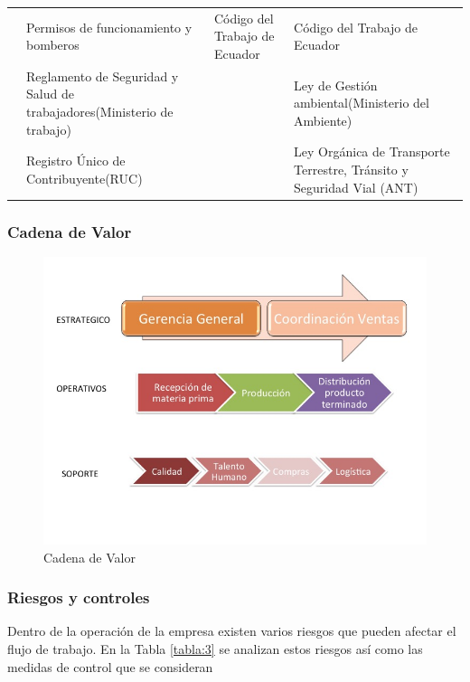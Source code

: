\documentclass[12pt, a4paper]{article}
\begin{document}
\begin{table}[H]
\begin{tabular}{|p{2cm}|p{3.5cm}|p{4cm}|p{4cm}|}
 & Permisos de funcionamiento y bomberos & Código del Trabajo de Ecuador & Código del Trabajo de Ecuador \\ \cline{2-4} 
 & Reglamento de Seguridad y Salud de trabajadores(Ministerio de trabajo) &  & Ley de Gestión ambiental(Ministerio del Ambiente) \\ \cline{2-4} 
 & Registro Único de Contribuyente(RUC) &  & Ley Orgánica de Transporte Terrestre, Tránsito y Seguridad Vial (ANT) \\ \hline
\end{tabular}
\end{table}


\subsubsection{Cadena de Valor}
\begin{figure}[H]
  \centering
  
    \includegraphics[width=1.1\textwidth]{CadenadeValor.jpg}
  \captionsetup{justification=centering} %
  \caption{Cadena de Valor}
  \label{figura:2}
\end{figure}

\subsubsection{Riesgos y controles}
Dentro de la operación de la empresa existen varios riesgos que pueden afectar el flujo de trabajo. En la Tabla \ref{tabla:3} se analizan estos riesgos así como las medidas de control que se consideran
\end{document}
